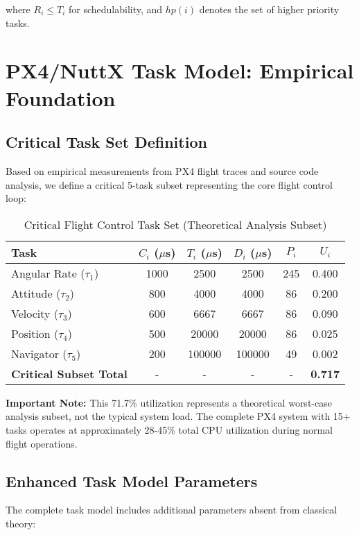 \documentclass[12pt,a4paper]{article}
\begin{document}
where $R_i \leq T_i$ for schedulability, and $hp(i)$ denotes the set of higher priority tasks.

\section{PX4/NuttX Task Model: Empirical Foundation}

\subsection{Critical Task Set Definition}

Based on empirical measurements from PX4 flight traces and source code analysis, we define a critical 5-task subset representing the core flight control loop:

\begin{table}[H]
\centering
\begin{tabular}{|l|c|c|c|c|c|}
\hline
\textbf{Task} & \textbf{$C_i$ ($\mu$s)} & \textbf{$T_i$ ($\mu$s)} & \textbf{$D_i$ ($\mu$s)} & \textbf{$P_i$} & \textbf{$U_i$} \\
\hline
Angular Rate ($\tau_1$) & 1000 & 2500 & 2500 & 245 & 0.400 \\
Attitude ($\tau_2$) & 800 & 4000 & 4000 & 86 & 0.200 \\
Velocity ($\tau_3$) & 600 & 6667 & 6667 & 86 & 0.090 \\
Position ($\tau_4$) & 500 & 20000 & 20000 & 86 & 0.025 \\
Navigator ($\tau_5$) & 200 & 100000 & 100000 & 49 & 0.002 \\
\hline
\textbf{Critical Subset Total} & - & - & - & - & \textbf{0.717} \\
\hline
\end{tabular}
\caption{Critical Flight Control Task Set (Theoretical Analysis Subset)}
\end{table}

\textbf{Important Note:} This 71.7\% utilization represents a theoretical worst-case analysis subset, not the typical system load. The complete PX4 system with 15+ tasks operates at approximately 28-45\% total CPU utilization during normal flight operations.

\subsection{Enhanced Task Model Parameters}

The complete task model includes additional parameters absent from classical theory:
\end{document}
